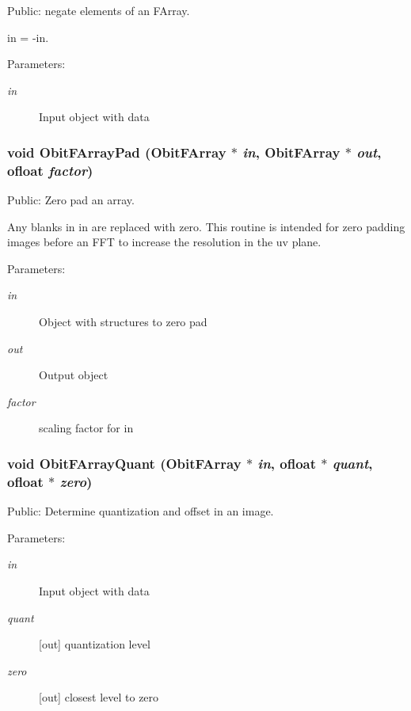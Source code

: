 Public: negate elements of an FArray. 

in = -in. \begin{Desc}
\item[Parameters:]
\begin{description}
\item[{\em in}]Input object with data \end{description}
\end{Desc}
\subsubsection{\setlength{\rightskip}{0pt plus 5cm}void Obit\-FArray\-Pad ({\bf Obit\-FArray} $\ast$ {\em in}, {\bf Obit\-FArray} $\ast$ {\em out}, {\bf ofloat} {\em factor})}\label{ObitFArray_8c_a65}


Public: Zero pad an array. 

Any blanks in in are replaced with zero. This routine is intended for zero padding images before an FFT to increase the resolution in the uv plane. \begin{Desc}
\item[Parameters:]
\begin{description}
\item[{\em in}]Object with structures to zero pad \item[{\em out}]Output object \item[{\em factor}]scaling factor for in \end{description}
\end{Desc}
\subsubsection{\setlength{\rightskip}{0pt plus 5cm}void Obit\-FArray\-Quant ({\bf Obit\-FArray} $\ast$ {\em in}, {\bf ofloat} $\ast$ {\em quant}, {\bf ofloat} $\ast$ {\em zero})}\label{ObitFArray_8c_a32}


Public: Determine quantization and offset in an image. 

\begin{Desc}
\item[Parameters:]
\begin{description}
\item[{\em in}]Input object with data \item[{\em quant}][out] quantization level \item[{\em zero}][out] closest level to zero \end{description}
\end{Desc}
